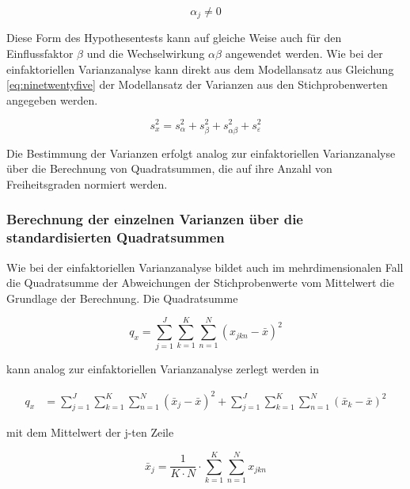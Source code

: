 \begin{equation}\label{eq:ninetwentyseven}
\alpha _{j} \ne 0
\end{equation}

\noindent Diese Form des Hypothesentests kann auf gleiche Weise auch f\"{u}r den Einflussfaktor $\beta$ und die Wechselwirkung $\alpha \beta$ angewendet werden. Wie bei der einfaktoriellen Varianzanalyse kann direkt aus dem Modellansatz aus Gleichung \eqref{eq:ninetwentyfive} der Modellansatz der Varianzen aus den Stichprobenwerten angegeben werden.

\begin{equation}\label{eq:ninetwentyeight}
s_{x}^{2} =s_{\alpha}^{2} +s_{\beta}^{2} +s_{\alpha \beta}^{2} +s_{\varepsilon}^{2}
\end{equation}

\noindent Die Bestimmung der Varianzen erfolgt analog zur einfaktoriellen Varianzanalyse \"{u}ber die Berechnung von Quadratsummen, die auf ihre Anzahl von Freiheitsgraden normiert werden.

\subsubsection{Berechnung der einzelnen Varianzen \"{u}ber die standardisierten Quadratsummen}

\noindent Wie bei der einfaktoriellen Varianzanalyse bildet auch im mehrdimensionalen Fall die Quadratsumme der Abweichungen der Stichprobenwerte vom Mittelwert die Grundlage der Berechnung. Die Quadratsumme

\begin{equation}\label{eq:ninetwentynine}
q_{x} =\sum _{j=1}^{J}\sum _{k=1}^{K}\sum _{n=1}^{N}(x_{jkn} -\bar{x})^{2}
\end{equation}

\noindent kann analog zur einfaktoriellen Varianzanalyse zerlegt werden in

\begin{equation}\label{eq:ninethirty}
\begin{split}
q_{x} & = \sum _{j=1}^{J}\sum _{k=1}^{K}\sum _{n=1}^{N}(\bar{x}_{j} -\bar{x})^{2}    +\sum _{j=1}^{J}\sum _{k=1}^{K}\sum _{n=1}^{N}(\bar{x}_{k} -\bar{x})^{2}
\end{split}
\end{equation}

\noindent mit dem Mittelwert der j-ten Zeile

\begin{equation}\label{eq:ninethirtyone}
\bar{x}_{j} =\dfrac{1}{K\cdot N} \cdot \sum _{k=1}^{K}\sum _{n=1}^{N}x_{jkn}
\end{equation}

